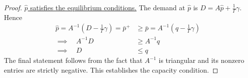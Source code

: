 \documentclass[12pt]{article}
\theoremstyle{definition}
\begin{document}
\begin{proof}

\underline{$\hat p$ satisfies the equilibrium conditions.} The demand at $\hat p$ is $D = A \hat p + \frac{1}{\Gamma}\gamma$. Hence
\begin{align*}
\hat p = A^{-1} (D - \frac{1}{\Gamma} \gamma) = \bar p^+ &\geq \bar p = A^{-1} (q - \frac{1}{\Gamma} \gamma) \\
\implies \quad A^{-1} D &\geq A^{-1} q \\
\implies \quad D &\leq q
\end{align*}
The final statement follows from the fact that $A^{-1}$ is triangular and its nonzero entries are strictly negative. This establishes the capacity condition. 


\end{proof}
\end{document}
